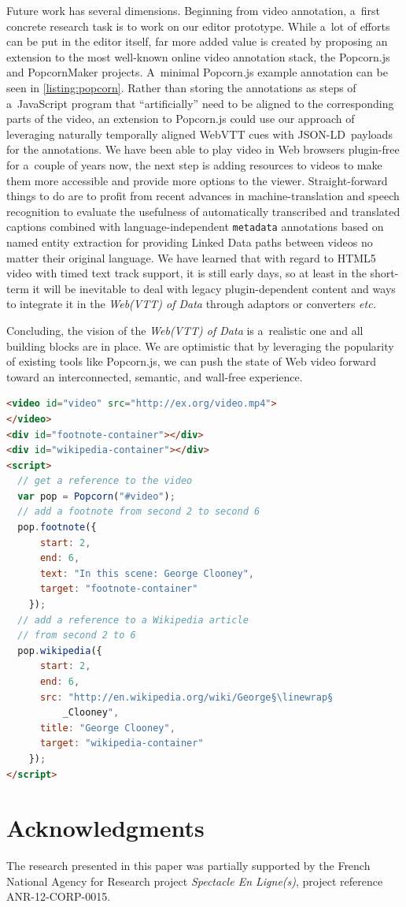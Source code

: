 \documentclass{sig-alternate}
\newcommand{\linewrap}{\raisebox{-.6ex}{\textcolor{grey}{$\hookleftarrow$}}}
\def\JSONLD{\mbox{JSON-LD}}
\begin{document}
Future work has several dimensions.
Beginning from video annotation, a~first concrete research task
is to work on our editor prototype.
While a~lot of efforts can be put in the editor itself,
far more added value is created by proposing an extension to the
most well-known online video annotation stack, the Popcorn.js 
and PopcornMaker projects.
A~minimal Popcorn.js example annotation can be seen in \autoref{listing:popcorn}.
Rather than storing the annotations as steps of a~JavaScript program
that ``artificially'' need to be aligned to the corresponding parts of the video,
an extension to Popcorn.js could use our approach of leveraging
naturally temporally aligned WebVTT cues with \JSONLD\ payloads for the annotations.
We have been able to play video in Web browsers plugin-free
for a~couple of years now, the next step is adding resources to videos
to make them more accessible and provide more options to the viewer.
Straight-forward things to do are to profit from recent advances
in machine-translation and speech recognition
to evaluate the usefulness of automatically
transcribed and translated captions combined with language-independent \texttt{metadata}
annotations based on named entity extraction for providing Linked Data
paths between videos no matter their original language.
We have learned that with regard to HTML5 video with timed text track support,
it is still early days, so at least in the short-term
it will be inevitable to deal with legacy plugin-dependent content
and ways to integrate it in the \emph{Web(VTT) of Data}
through adaptors or converters \emph{etc.}

Concluding, the vision of the \emph{Web(VTT) of Data} is a~realistic one
and all building blocks are in place.
We are optimistic that by leveraging the popularity
of existing tools like Popcorn.js, we can push the state of Web video forward
toward an interconnected, semantic, and wall-free experience.  

\begin{lstlisting}[caption={Popcorn.js example},
  label=listing:popcorn, float=h!, language=html]
<video id="video" src="http://ex.org/video.mp4">
</video>
<div id="footnote-container"></div>
<div id="wikipedia-container"></div>
<script>
  // get a reference to the video
  var pop = Popcorn("#video");
  // add a footnote from second 2 to second 6
  pop.footnote({
      start: 2,
      end: 6,
      text: "In this scene: George Clooney",
      target: "footnote-container"
    });
  // add a reference to a Wikipedia article
  // from second 2 to 6  
  pop.wikipedia({
      start: 2,
      end: 6,
      src: "http://en.wikipedia.org/wiki/George§\linewrap§
          _Clooney",
      title: "George Clooney",
      target: "wikipedia-container"
    });    
</script>
\end{lstlisting}

\section*{Acknowledgments}

The research presented in this paper was partially supported
by the French National Agency for Research  project
\emph{Spectacle En Ligne(s)}, project reference
\mbox{ANR-12-CORP-0015}.\vfill



\end{document}
